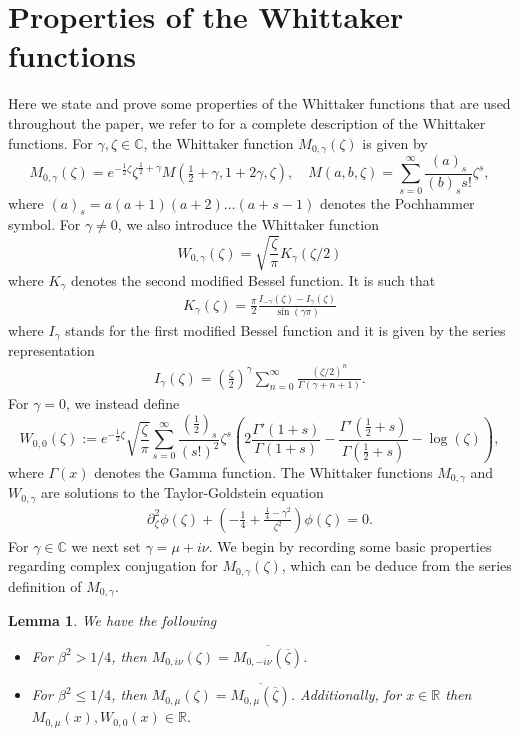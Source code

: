 \documentclass[11pt,reqno]{amsproc}
\newtheorem{lemma}[proposition]{Lemma}
\theoremstyle{definition}
\numberwithin{equation}{section}
\newcommand{\C}{{\mathbb C}}
\newcommand{\R}{{\mathbb R}}
\renewcommand{\b}{\beta}
\renewcommand{\l}{\left}
\renewcommand{\r}{\right}
\begin{document}
\section{Properties of the Whittaker functions}\label{app:Whittaker}
Here we state and prove some properties of the Whittaker functions that are used throughout the paper, we refer to \cite{NIST} for a complete description of the Whittaker functions. For $\gamma, \zeta\in \C$, the Whittaker function $M_{0,\gamma}(\zeta)$ is given by
\begin{equation*}
M_{0,\gamma}(\zeta)=e^{-\frac12\zeta}\zeta^{\frac12 + \gamma}M\l( \tfrac12 + \gamma, 1+2\gamma, \zeta\r), \quad M(a,b,\zeta) = \sum_{s=0}^\infty \frac{(a)_s}{(b)_s s!}\zeta^s,
\end{equation*}
where $(a)_s=a(a+1)(a+2)\dots (a+s-1)$ denotes the Pochhammer symbol. For $\gamma\neq 0$, we also introduce the Whittaker function 
\begin{equation*}
W_{0,\gamma}(\zeta) = \sqrt{\frac{\zeta}{\pi}}K_{\gamma}(\zeta/2)
\end{equation*}
where $K_\gamma$ denotes the second modified Bessel function. It is such that
\begin{align*}
K_\gamma(\zeta) = \frac{\pi}{2}\frac{I_{-\gamma}(\zeta) - I_{\gamma}(\zeta)}{\sin(\gamma\pi)}
\end{align*}
where $I_\gamma$ stands for the first modified Bessel function and it is given by the series representation
\begin{align*}
I_\gamma(\zeta) = \left( \frac{\zeta}{2}\right)^\gamma \sum_{n=0}^\infty \frac{(\zeta/2)^n}{\Gamma (\gamma + n + 1)}.
\end{align*}
For $\gamma=0$, we instead define
\begin{equation*}
W_{0,0}(\zeta) :=e^{-\frac12\zeta}\sqrt{\frac{\zeta}{\pi}}\sum_{s=0}^\infty \frac{\l( \tfrac12 \r)_s}{(s!)^2}\zeta^s \l( 2\frac{\Gamma'(1+s)}{\Gamma(1+s)} - \frac{\Gamma'(\tfrac12+s)}{\Gamma(\tfrac12+s)} - \log(\zeta)\r),
\end{equation*}
where $\Gamma(x)$ denotes the Gamma function. The Whittaker functions $M_{0,\gamma}$ and $W_{0,\gamma}$ are solutions to the Taylor-Goldstein equation
\begin{align*}
\partial_\zeta^2\phi(\zeta) + \left( - \frac{1}{4} + \frac{\frac14 - \gamma^2}{\zeta^2} \right)\phi(\zeta)=0.
\end{align*}
For $\gamma\in \C$ we next set $\gamma=\mu+i\nu$. We begin by recording some basic properties regarding complex conjugation for $M_{0,\gamma}(\zeta)$, which can be deduce from the series definition of $M_{0,\gamma}$.
\begin{lemma}
We have the following
\begin{itemize}
\item For $\b^2>1/4$, then $M_{0,i\nu}(\zeta)=\overline{M_{0,-i\nu}\l(\overline{\zeta}\r)}$.
\item For $\b^2\leq 1/4$, then $M_{0,\mu}(\zeta) = \overline{M_{0,\mu}\l(\overline{\zeta}\r)}$. Additionally, for $x\in\R$ then $M_{0,\mu}(x),W_{0,0}(x)\in \R$. 
\end{itemize}
\end{lemma}
\end{document}
